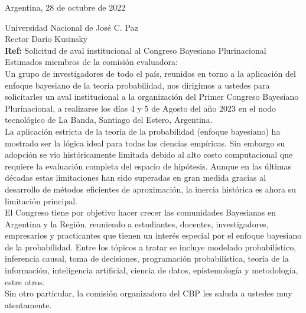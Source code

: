 \documentclass[a4paper,11pt]{article}
\begin{document}
\begin{flushright}
Argentina, 28 de octubre de 2022
\end{flushright} 

\vspace{0.1cm}
\noindent
Universidad Nacional de José C. Paz \\
Rector Darío Kusinsky\\[-0.1cm]

\hfill \textbf{Ref:} Solicitud de aval institucional al Congreso Bayesiano Plurinacional \\

\vspace{0.3cm} \noindent Estimados miembros de la comisión evaluadora:\\

\indent Un grupo de investigadores de todo el país, reunidos en torno a la aplicación del enfoque bayesiano de la teoría probabilidad, nos dirigimos a ustedes para solicitarles un aval institucional a la organización del Primer Congreso Bayesiano Plurinacional, a realizarse los días 4 y 5 de Agosto del año 2023 en el nodo tecnológico de La Banda, Santiago del Estero, Argentina. \\

\indent La aplicación estricta de la teoría de la probabilidad (enfoque bayesiano) ha mostrado ser la lógica ideal para todas las ciencias empíricas.
Sin embargo su adopción se vio históricamente limitada debido al alto costo computacional que requiere la evaluación completa del espacio de hipótesis.
Aunque en las últimas décadas estas limitaciones han sido superadas en gran medida gracias al desarrollo de métodos eficientes de aproximación, la inercia histórica es ahora su limitación principal. \\

\indent  El Congreso tiene por objetivo hacer crecer las comunidades Bayesianas en Argentina y la Región, reuniendo a estudiantes, docentes, investigadores, empresarios y practicantes que tienen un interés especial por el enfoque bayesiano de la probabilidad. Entre los tópicos a tratar se incluye modelado probabilístico, inferencia causal, toma de decisiones, programación probabilística, teoría de la información, inteligencia artificial, ciencia de datos, epistemología y metodología, estre otros. \\

\indent Sin otro particular, la comisión organizadora del CBP les saluda a ustedes muy atentamente.\\
\end{document}
